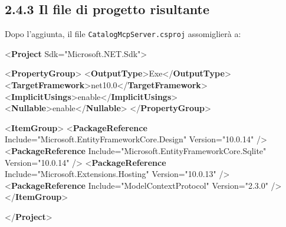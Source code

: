 \documentclass[
  italian,
  10pt,
]{book}
\newenvironment{Shaded}{\begin{snugshade}}{\end{snugshade}}
\newcommand{\KeywordTok}[1]{\textcolor[rgb]{0.13,0.29,0.53}{\textbf{#1}}}
\newcommand{\NormalTok}[1]{#1}
\newcommand{\OtherTok}[1]{\textcolor[rgb]{0.56,0.35,0.01}{#1}}
\newcommand{\StringTok}[1]{\textcolor[rgb]{0.31,0.60,0.02}{#1}}
\begin{document}
\subsection{2.4.3 Il file di progetto
risultante}\label{il-file-di-progetto-risultante}

Dopo l'aggiunta, il file \texttt{CatalogMcpServer.csproj} assomiglierà
a:

\begin{Shaded}
\begin{Highlighting}[]
\NormalTok{\textless{}}\KeywordTok{Project} \OtherTok{Sdk=}\StringTok{"Microsoft.NET.Sdk"}\NormalTok{\textgreater{}}

\NormalTok{  \textless{}}\KeywordTok{PropertyGroup}\NormalTok{\textgreater{}}
\NormalTok{    \textless{}}\KeywordTok{OutputType}\NormalTok{\textgreater{}Exe\textless{}/}\KeywordTok{OutputType}\NormalTok{\textgreater{}}
\NormalTok{    \textless{}}\KeywordTok{TargetFramework}\NormalTok{\textgreater{}net10.0\textless{}/}\KeywordTok{TargetFramework}\NormalTok{\textgreater{}}
\NormalTok{    \textless{}}\KeywordTok{ImplicitUsings}\NormalTok{\textgreater{}enable\textless{}/}\KeywordTok{ImplicitUsings}\NormalTok{\textgreater{}}
\NormalTok{    \textless{}}\KeywordTok{Nullable}\NormalTok{\textgreater{}enable\textless{}/}\KeywordTok{Nullable}\NormalTok{\textgreater{}}
\NormalTok{  \textless{}/}\KeywordTok{PropertyGroup}\NormalTok{\textgreater{}}

\NormalTok{  \textless{}}\KeywordTok{ItemGroup}\NormalTok{\textgreater{}}
\NormalTok{    \textless{}}\KeywordTok{PackageReference} \OtherTok{Include=}\StringTok{"Microsoft.EntityFrameworkCore.Design"} \OtherTok{Version=}\StringTok{"10.0.14"}\NormalTok{ /\textgreater{}}
\NormalTok{    \textless{}}\KeywordTok{PackageReference} \OtherTok{Include=}\StringTok{"Microsoft.EntityFrameworkCore.Sqlite"} \OtherTok{Version=}\StringTok{"10.0.14"}\NormalTok{ /\textgreater{}}
\NormalTok{    \textless{}}\KeywordTok{PackageReference} \OtherTok{Include=}\StringTok{"Microsoft.Extensions.Hosting"} \OtherTok{Version=}\StringTok{"10.0.13"}\NormalTok{ /\textgreater{}}
\NormalTok{    \textless{}}\KeywordTok{PackageReference} \OtherTok{Include=}\StringTok{"ModelContextProtocol"} \OtherTok{Version=}\StringTok{"2.3.0"}\NormalTok{ /\textgreater{}}
\NormalTok{  \textless{}/}\KeywordTok{ItemGroup}\NormalTok{\textgreater{}}

\NormalTok{\textless{}/}\KeywordTok{Project}\NormalTok{\textgreater{}}
\end{Highlighting}
\end{Shaded}
\end{document}
